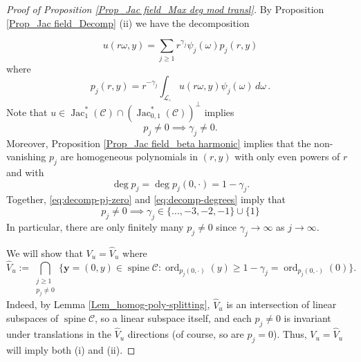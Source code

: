 \documentclass[11pt, letterpaper, reqno]{amsart}
\numberwithin{equation}{section}
\theoremstyle{remark}
\newcommand{\cC}{\mathcal{C}}
\newcommand{\cL}{\mathcal{L}}
\newcommand{\mbfy}{\mathbf{y}}
\newcommand{\Jac}{\operatorname{Jac}}
\newcommand{\spine}{\operatorname{spine}}
\newcommand{\Ord}{\operatorname{ord}}
\begin{document}
    \begin{proof}[Proof of Proposition \ref{Prop_Jac field_Max deg mod transl}]
	 By Proposition \ref{Prop_Jac field_Decomp} {(ii)} we have the decomposition
	 	 
\begin{equation}
 \label{eq:decomp}
 u(r\omega, y) = \sum_{j\geq 1} r^{\gamma_j} \psi_j(\omega) p_j(r, y)
\end{equation}
where 
      \[
      p_j(r,y) = r^{-\gamma_j} \int_{\cL_\circ} u(r\omega,y) \psi_j(\omega)\, d\omega\,.
      \]
      Note that $u \in \Jac^*_1(\cC) \cap (\Jac^*_{0,1}(\cC))^\perp$ implies
      \begin{equation} \label{eq:decomp-pj-zero}
      p_j \neq 0 \implies \gamma_j \neq 0.
      \end{equation}
      Moreover, Proposition \ref{Prop_Jac field_beta harmonic} implies that the non-vanishing $p_j$ are homogeneous polynomials in $(r,y)$ with only even powers of $r$ and with
      \begin{equation} \label{eq:decomp-degrees}
      \deg p_j = \deg p_j(0,\cdot) = 1 - \gamma_j. 
      \end{equation}
      Together, \eqref{eq:decomp-pj-zero} and \eqref{eq:decomp-degrees} imply that
      \begin{equation} \label{eq:decomp-gamma}
      p_j \neq 0 \implies \gamma_j \in \{ \ldots, -3, -2, -1 \} \cup \{ 1 \}
      \end{equation}
      In particular, there are only finitely many $p_j \neq 0$ since $\gamma_j \to \infty$ as $j \to \infty$.

    We will show that $V_u = \hat V_u$ where
      \[
      \hat V_u := \bigcap_{\substack{j \geq 1 \\ p_j \neq 0}} \{\mbfy = (0, y) \in \spine \cC : \Ord_{p_j(0,\cdot)}(y) \geq 1 - \gamma_j = \Ord_{p_j(0,\cdot)}(0)\}. 
      \]
      Indeed, by Lemma \ref{Lem_homog-poly-splitting}, $\hat V_u$ is an intersection of linear subspaces of $\spine \cC$, so a linear subspace itself, and each  $p_j \neq 0$ is invariant under translations in the $\hat V_u$ directions (of course, so are $p_j = 0$). Thus, $V_u = \hat V_u$ will imply both {(i)} and {(ii)}.
      

\end{proof}
\end{document}

